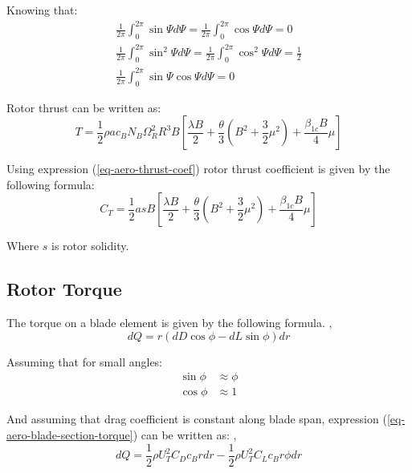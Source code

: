 Knowing that: \cite{GessowMyers1985}
\begin{gather}
  \frac{1}{2\pi} \int_{0}^{2\pi} \sin \Psi d\Psi =
  \frac{1}{2\pi} \int_{0}^{2\pi} \cos \Psi d\Psi = 0 \\
  \frac{1}{2\pi} \int_{0}^{2\pi} \sin^2 \Psi d\Psi =
  \frac{1}{2\pi} \int_{0}^{2\pi} \cos^2 \Psi d\Psi = \frac{1}{2} \\
  \frac{1}{2\pi} \int_{0}^{2\pi} \sin \Psi \cos \Psi d\Psi = 0
\end{gather}

Rotor thrust can be written as:
\begin{equation}
  T = \frac{1}{2} \rho a c_B N_B \Omega_R^2 R^3 B
  \left[
    \frac{\lambda B}{2} 
    +
    \frac{\theta}{3} \left( B^2 + \frac{3}{2} \mu^2 \right)
    +
    \frac{\beta_{1c} B}{4} \mu
  \right]
\end{equation}

Using expression (\ref{eq-aero-thrust-coef}) rotor thrust coefficient is given by the following formula:
\begin{equation}
  C_T = \frac{1}{2} a s B
  \left[
    \frac{\lambda B}{2}
    +
    \frac{\theta}{3} \left( B^2 + \frac{3}{2} \mu^2 \right)
    +
    \frac{\beta_{1c} B}{4} \mu
  \right]
\end{equation}

Where $s$ is rotor solidity.

\subsection{Rotor Torque}

The torque on a blade element is given by the following formula. \cite{GessowMyers1985}, \cite{Bramwell2001}
\begin{equation}
  \label{eq-aero-blade-section-torque}
  dQ = r \left( dD \cos \phi - dL \sin \phi \right) dr
\end{equation}

Assuming that for small angles:
\begin{align}
  \sin \phi &\approx \phi \\
  \cos \phi &\approx 1
\end{align}

And assuming that drag coefficient is constant along blade span, expression (\ref{eq-aero-blade-section-torque}) can be written as: \cite{GessowMyers1985}, \cite{Bramwell2001}
\begin{equation}
  dQ =
  \frac{1}{2} \rho U_T^2 C_D c_B r dr -
  \frac{1}{2} \rho U_T^2 C_L c_B r \phi dr
\end{equation}

